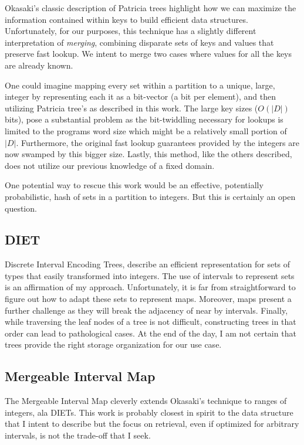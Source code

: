 \documentclass{article}
\begin{document}
Okasaki's classic description\cite{Okasaki1998} of Patricia trees highlight how
we can maximize the information contained within keys to build efficient data
structures.
Unfortunately, for our purposes, this technique has a slightly different
interpretation of \emph{merging},
combining disparate sets of keys and values that preserve fast lookup.
We intent to merge two cases where values for all the keys are already known.

One could imagine mapping every set within a partition to a unique, large,
integer by representing each it as a bit-vector (a bit per element), and then
utilizing Patricia tree's as described in this work.
The large key sizes ($O(|D|)$ bits),
pose a substantial problem as the bit-twiddling necessary for lookups is
limited to the programs word size which might be a relatively small portion
of $|D|$.
Furthermore, the original fast lookup guarantees provided by the integers are
now swamped by this bigger size.
Lastly, this method, like the others described, does not utilize our previous
knowledge of a fixed domain.

One potential way to rescue this work would be an effective,
potentially probabilistic,
hash of sets in a partition to integers.
But this is certainly an open question.

\subsection{DIET}

Discrete Interval Encoding Trees\cite{Erwig1993},
describe an efficient representation for sets of types that easily transformed
into integers.
The use of intervals to represent sets is an affirmation of my approach.
Unfortunately, it is far from straightforward to figure out how to adapt these
sets to represent maps.
Moreover, maps present a further challenge as they will break the adjacency of
near by intervals.
Finally,
while traversing the leaf nodes of a tree is not difficult,
constructing trees in that order can lead to pathological cases.
At the end of the day,
I am not certain that trees provide the right storage organization for our use
case.

\subsection{Mergeable Interval Map}

The Mergeable Interval Map\cite{Bonichon2010} cleverly extends Okasaki's
technique to ranges of integers, ala DIETs.
This work is probably closest in spirit to the
data structure that I intent to describe but the focus on retrieval,
even if optimized for arbitrary intervals,
is not the trade-off that I seek.
\end{document}
